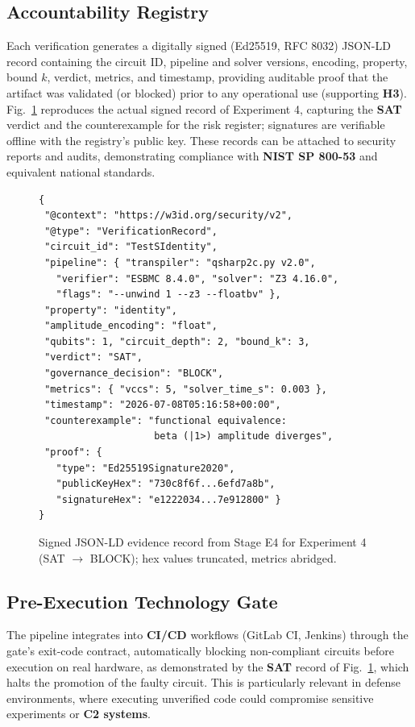 \documentclass[journal]{IEEEtran} %
\begin{document}
\subsection{Accountability Registry}
Each verification generates a digitally signed (Ed25519, RFC 8032) JSON-LD record containing the circuit ID, pipeline and solver versions, encoding, property, bound $k$, verdict, metrics, and timestamp, providing auditable proof that the artifact was validated (or blocked) prior to any operational use (supporting \textbf{H3}). Fig.~\ref{fig:jsonld} reproduces the actual signed record of Experiment 4, capturing the \textbf{SAT} verdict and the counterexample for the risk register; signatures are verifiable offline with the registry's public key. These records can be attached to security reports and audits, demonstrating compliance with \textbf{NIST SP 800-53} \cite{ref23} and equivalent national standards.

\begin{figure}[!t]
\centering
\scriptsize
\begin{verbatim}
{
 "@context": "https://w3id.org/security/v2",
 "@type": "VerificationRecord",
 "circuit_id": "TestSIdentity",
 "pipeline": { "transpiler": "qsharp2c.py v2.0",
   "verifier": "ESBMC 8.4.0", "solver": "Z3 4.16.0",
   "flags": "--unwind 1 --z3 --floatbv" },
 "property": "identity",
 "amplitude_encoding": "float",
 "qubits": 1, "circuit_depth": 2, "bound_k": 3,
 "verdict": "SAT",
 "governance_decision": "BLOCK",
 "metrics": { "vccs": 5, "solver_time_s": 0.003 },
 "timestamp": "2026-07-08T05:16:58+00:00",
 "counterexample": "functional equivalence:
                    beta (|1>) amplitude diverges",
 "proof": {
   "type": "Ed25519Signature2020",
   "publicKeyHex": "730c8f6f...6efd7a8b",
   "signatureHex": "e1222034...7e912800" }
}
\end{verbatim}
\caption{Signed JSON-LD evidence record from Stage E4 for Experiment 4 (SAT $\rightarrow$ BLOCK); hex values truncated, metrics abridged.}
\label{fig:jsonld}
\end{figure}

\subsection{Pre-Execution Technology Gate}
The pipeline integrates into \textbf{CI/CD} workflows (GitLab CI, Jenkins) through the gate's exit-code contract, automatically blocking non-compliant circuits before execution on real hardware, as demonstrated by the \textbf{SAT} record of Fig.~\ref{fig:jsonld}, which halts the promotion of the faulty circuit. This is particularly relevant in defense environments, where executing unverified code could compromise sensitive experiments or \textbf{C2 systems}.
\end{document}
